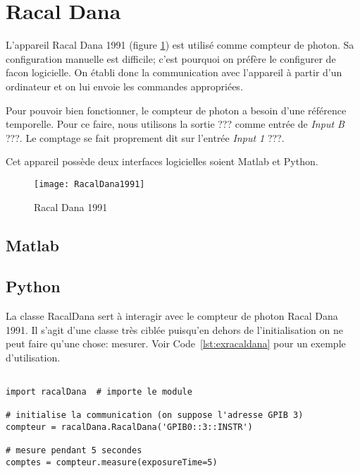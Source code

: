 \documentclass[11pt,francais]{book} %
\begin{document}
\section{Racal Dana}

L'appareil Racal Dana 1991 (figure \ref{fig:racaldana}) est utilisé comme compteur de photon.
Sa configuration manuelle est difficile; c'est pourquoi on préfère le configurer de facon logicielle.
On établi donc la communication avec l'appareil à partir d'un ordinateur et on lui envoie les commandes appropriées.

Pour pouvoir bien fonctionner, le compteur de photon a besoin d'une référence temporelle.
Pour ce faire, nous utilisons la sortie ??? comme entrée de {\it Input B} ???.
Le comptage se fait proprement dit sur l'entrée {\it Input 1} ???.

Cet appareil possède deux interfaces logicielles soient Matlab et Python.

\begin{figure}[h]
\centering\texttt{[image: RacalDana1991]}
\caption{Racal Dana 1991}
\label{fig:racaldana}
\end{figure}

\subsection{Matlab}

\subsection{Python}

La classe RacalDana sert à interagir avec le compteur de photon Racal Dana 1991.
Il s'agit d'une classe très ciblée puisqu'en dehors de l'initialisation on ne peut faire qu'une chose: mesurer.
Voir Code~\ref{lst:exracaldana} pour un exemple d'utilisation.

\begin{lstlisting}[frame=single,caption={Exemple d'utilisation de {\it RacalDana avec Python}},label={lst:exracaldana},breaklines=true,]  % Start your code-block
 
import racalDana  # importe le module

# initialise la communication (on suppose l'adresse GPIB 3)
compteur = racalDana.RacalDana('GPIB0::3::INSTR') 

# mesure pendant 5 secondes
comptes = compteur.measure(exposureTime=5)
\end{lstlisting}
\end{document}

